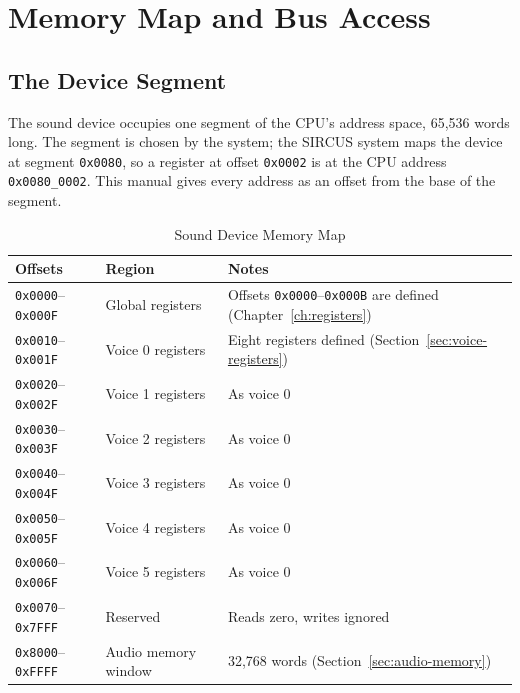 \chapter{Memory Map and Bus Access}
\label{ch:memory-map}

\section{The Device Segment}

The sound device occupies one segment of the CPU's address space, 65,536 words long. The segment is chosen by the
system; the SIRCUS system maps the device at segment \texttt{0x0080}, so a register at offset \texttt{0x0002} is at the
CPU address \texttt{0x0080\_0002}. This manual gives every address as an offset from the base of the segment.

\begin{table}[H]
	\centering
	\begin{tabular}{llp{6.5cm}}
		\toprule
		\textbf{Offsets}                 & \textbf{Region}     & \textbf{Notes}                                                                    \\
		\midrule
		\texttt{0x0000}--\texttt{0x000F} & Global registers    & Offsets \texttt{0x0000}--\texttt{0x000B} are defined (Chapter~\ref{ch:registers}) \\
		\texttt{0x0010}--\texttt{0x001F} & Voice 0 registers   & Eight registers defined (Section~\ref{sec:voice-registers})                       \\
		\texttt{0x0020}--\texttt{0x002F} & Voice 1 registers   & As voice 0                                                                        \\
		\texttt{0x0030}--\texttt{0x003F} & Voice 2 registers   & As voice 0                                                                        \\
		\texttt{0x0040}--\texttt{0x004F} & Voice 3 registers   & As voice 0                                                                        \\
		\texttt{0x0050}--\texttt{0x005F} & Voice 4 registers   & As voice 0                                                                        \\
		\texttt{0x0060}--\texttt{0x006F} & Voice 5 registers   & As voice 0                                                                        \\
		\texttt{0x0070}--\texttt{0x7FFF} & Reserved            & Reads zero, writes ignored                                                        \\
		\texttt{0x8000}--\texttt{0xFFFF} & Audio memory window & 32,768 words (Section~\ref{sec:audio-memory})                                     \\
		\bottomrule
	\end{tabular}
	\caption{Sound Device Memory Map}
	\label{tab:memory-map}
\end{table}

